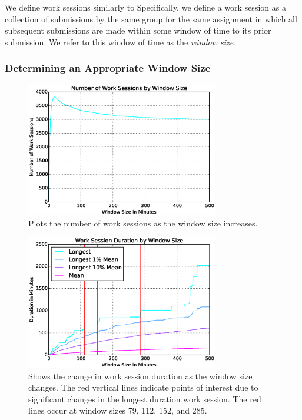 We define work sessions similarly to \spacco[.]{} Specifically, we define a
work session as a collection of submissions by the same group for the same
assignment in which all subsequent submissions are made within some window of
time to its prior submission. We refer to this window of time as the
\emph{window size}.

\subsubsection{Determining an Appropriate Window Size}

\begin{figure}[!t]
\centering
\includegraphics[width=3.3in]{graphs/Number_of_Work_Sessions_by_Window_Size.eps}
\caption{Plots the number of work sessions as the window size increases.}
\end{figure}

\begin{figure}[!t]
\centering
\includegraphics[width=3.3in]{graphs/Work_Session_Duration_by_Window_Size.eps}
\caption{Shows the change in work session duration as the window size
  changes. The red vertical lines indicate points of interest due to
  significant changes in the longest duration work session. The red lines occur
  at window sizes 79, 112, 152, and 285.}
\end{figure}

